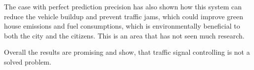 The case with perfect prediction precision has also shown how this system can reduce the vehicle buildup and prevent traffic jams, which could improve green house emissions and fuel consumptions, which is environmentally beneficial to both the city and the citizens. This is an area that has not seen much research.

Overall the results are promising and show, that traffic signal controlling is not a solved problem.